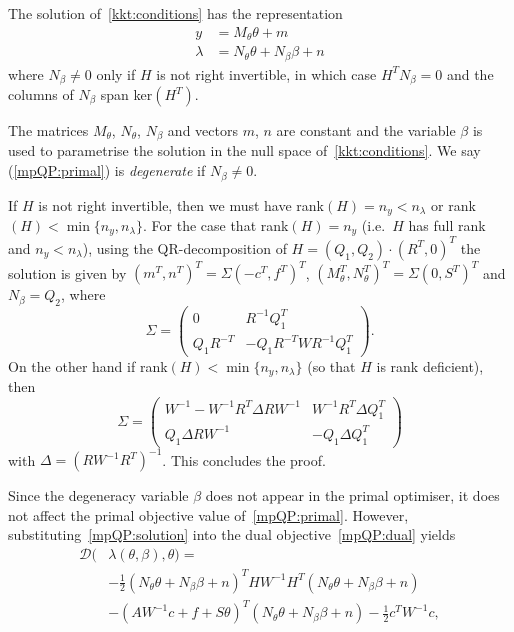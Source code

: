 \documentclass{ifacconf}
\begin{document}
\begin{lem}\label{lem:mpQP:solution}
The solution of~\eqref{kkt:conditions} has the representation
\begin{equation}\label{mpQP:solution}
	\begin{split}
		y &= M_\theta \theta + m\\
		\lambda &= N_\theta \theta + N_\beta \beta + n
	\end{split}
\end{equation}
where $N_\beta\neq 0$ only if $H$ is not right invertible, in which case $H^TN_\beta=0$ and the columns
of $N_\beta$ span ker$(H^T)$.
\end{lem}
%
The matrices $M_\theta$, $N_\theta$, $N_\beta$ and vectors $m$, $n$
are constant and the variable $\beta$ is used to parametrise the solution in the null space
of~\eqref{kkt:conditions}. We say (\ref{mpQP:primal}) is \textit{degenerate} if $N_\beta\neq 0$.
%
\begin{pf}
If $H$ is not right invertible, then we must have rank$(H)=n_y<n_\lambda$ or
rank$(H)<\min\{n_y,n_\lambda\}$.
For the case that rank$(H)=n_y$ (i.e.\ $H$ has full rank and $n_y<n_\lambda$), 
using the QR-decomposition \citep[e.g.][]{Nocedal:2006} of $H=(Q_1,Q_2)\cdot(R^T,0)^T$ the solution 
is given by $(m^T,n^T)^T = \Sigma (-c^T,f^T)^T$, $(M_\theta^T,N_\theta^T)^T = 
\Sigma (0,S^T)^T$ and $N_\beta=Q_2$, where 
\[
	\Sigma = \left(\begin{array}{cc}
	0 & R^{-1}Q_1^T \\
	Q_1 R^{-T} & -Q_1R^{-T}WR^{-1}Q_1^T
	\end{array}\right) .
\]
On the other hand if rank$(H)<\min\{n_y,n_\lambda\}$ (so that $H$ is rank deficient), then
\[
	\Sigma = \left(\begin{array}{cc}
	W^{-1}-W^{-1}R^T\Delta RW^{-1} & W^{-1}R^{T}\Delta Q_1^{T}\\
	Q_1\Delta R W^{-1} & -Q_1\Delta Q_1^T
	\end{array}\right)
\]
with $\Delta = (RW^{-1}R^T)^{-1}$. This concludes the proof.
\end{pf}
%
Since the degeneracy variable $\beta$ does not appear in the
primal optimiser, it does not affect the primal objective value of~\eqref{mpQP:primal}.
However, substituting~\eqref{mpQP:solution} into the dual objective~\eqref{mpQP:dual} yields
\begin{align*}
\mathcal D(&\lambda(\theta,\beta),\theta) = \\
& {-\tfrac{1}{2}}(N_\theta \theta + N_\beta \beta + n)^T H W^{-1}H^T 
	(N_\theta \theta + N_\beta \beta + n)\\
& -(AW^{-1}c + 
	f + S\theta)^T(N_\theta \theta + N_\beta \beta + n) -\tfrac{1}{2}c^TW^{-1}c,
\end{align*}
\end{document}
